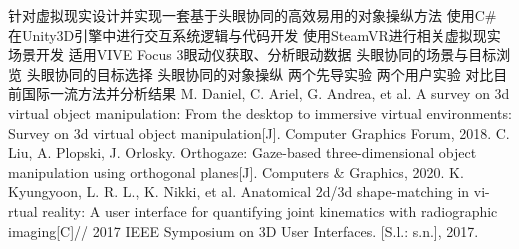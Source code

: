 \assignReq
{针对虚拟现实设计并实现一套基于头眼协同的高效易用的对象操纵方法}
{使用C\# 在Unity3D引擎中进行交互系统逻辑与代码开发}
{使用SteamVR进行相关虚拟现实场景开发}
{适用VIVE Focus 3眼动仪获取、分析眼动数据}
{}
\assignWork
{头眼协同的场景与目标浏览}
{头眼协同的目标选择}
{头眼协同的对象操纵}
{两个先导实验}
{两个用户实验}
{对比目前国际一流方法并分析结果}
\assignRef
{M. Daniel, C. Ariel, G. Andrea, et al. A survey on 3d virtual object manipulation: }
{From the desktop to immersive virtual environments: Survey on 3d virtual object }
{manipulation[J]. Computer Graphics Forum, 2018.}
{C. Liu, A. Plopski, J. Orlosky. Orthogaze: Gaze­-based three­-dimensional object }
{manipu­lation using orthogonal planes[J]. Computers \& Graphics, 2020.}
{K. Kyungyoon, L. R. L., K. Nikki, et al. Anatomical 2d/3d shape­-matching in vi-}
{rtual reality: A user interface for quantifying joint kinematics with radiographic }
{imaging[C]// 2017 IEEE Symposium on 3D User Interfaces. [S.l.: s.n.], 2017.}

